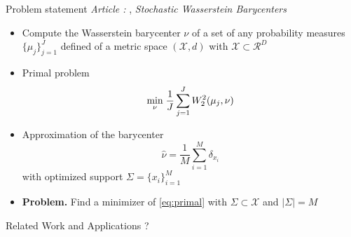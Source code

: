 \begin{frame}{Problem statement}
    \textit{Article :} \cite{claici_stochastic_2018}, \textit{Stochastic Wasserstein Barycenters}
    \begin{itemize}
        \item Compute the Wasserstein barycenter $\nu$ of a set of any probability measures $\lbrace \mu_j \rbrace_{j=1}^J$  defined of a metric space $(\mathcal{X}, d)$ with $\mathcal{X} \subset \mathcal{R}^D$
        \item Primal problem 
        \begin{equation}\label{eq:primal}
        \underset{\nu}{\min}\; \frac{1}{J}\sum_{j=1}^{J} W_2^2(\mu_j, \nu)
        \end{equation}
        \pause
        \item Approximation of the barycenter 
        $$ \hat{\nu} = \frac{1}{M} \sum_{i=1}^{M} \delta_{x_i} $$
        with optimized support $\Sigma = \lbrace x_i \rbrace_{i=1}^M$ 
        \item \textbf{Problem.} Find a minimizer of \eqref{eq:primal} with $\Sigma\subset \mathcal{X}$ and $|\Sigma| = M$
    \end{itemize}
\end{frame}

    

\begin{frame}{Related Work and Applications ?} 
    
\end{frame}